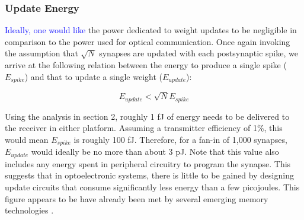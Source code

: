 \documentclass[twocolumn]{article}
\begin{document}

\subsubsection{Update Energy}
\textcolor{blue}{Ideally, one would like} the power dedicated to weight updates to be negligible in comparison to the power used for optical communication. Once again invoking the assumption that $\sqrt{N}$ synapses are updated with each postsynaptic spike, we arrive at the following relation between the energy to produce a single spike ($E_{spike}$) and that to update a single weight ($E_{update}$):

\begin{equation}
    E_{update} < \sqrt{N}E_{spike}
\end{equation}

Using the analysis in section 2, roughly 1 fJ of energy needs to be delivered to the receiver in either platform. Assuming a transmitter efficiency of 1\%, this would mean $E_{spike}$ is roughly 100 fJ. Therefore, for a fan-in of 1,000 synapses, $E_{update}$ would ideally be no more than about 3 pJ. Note that this value also includes any energy spent in peripheral circuitry to program the synapse. This suggests that in optoelectronic systems, there is little to be gained by designing update circuits that consume significantly less energy than a few picojoules. This figure appears to be have already been met by several emerging memory technologies \cite{zahoor2020resistive}.
\end{document}
